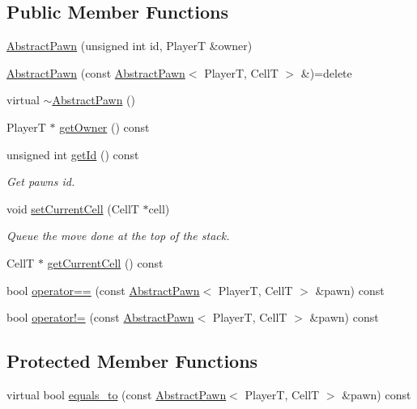 \subsection*{Public Member Functions}
\begin{DoxyCompactItemize}
\item 
\hyperlink{classgame_1_1_abstract_pawn_af1bc0b6647a170f6d4be38a6475757e3}{Abstract\+Pawn} (unsigned int id, PlayerT \&owner)
\item 
\hyperlink{classgame_1_1_abstract_pawn_af83fab32ac2e13daf3c693d465a061ed}{Abstract\+Pawn} (const \hyperlink{classgame_1_1_abstract_pawn}{Abstract\+Pawn}$<$ PlayerT, CellT $>$ \&)=delete
\item 
virtual \hyperlink{classgame_1_1_abstract_pawn_a3fa5336d077fb00b3b3df2bc662e62eb}{$\sim$\+Abstract\+Pawn} ()
\item 
PlayerT $\ast$ \hyperlink{classgame_1_1_abstract_pawn_aac49fdd8bd4aa4386fd47d3f6993b8df}{get\+Owner} () const
\item 
unsigned int \hyperlink{classgame_1_1_abstract_pawn_a49354506912d0e1bf5272627aa2bc86e}{get\+Id} () const
\begin{DoxyCompactList}\small\item\em Get pawn\textquotesingle{}s id. \end{DoxyCompactList}\item 
void \hyperlink{classgame_1_1_abstract_pawn_a678ab4c2f0191bafa3e1e16cf04fa9d0}{set\+Current\+Cell} (CellT $\ast$cell)
\begin{DoxyCompactList}\small\item\em Queue the move done at the top of the stack. \end{DoxyCompactList}\item 
CellT $\ast$ \hyperlink{classgame_1_1_abstract_pawn_ae9ad3bf0ee738571d0dd5992feae6bb7}{get\+Current\+Cell} () const
\item 
bool \hyperlink{classgame_1_1_abstract_pawn_a65dada55fadc0df1169d8a6b0661c05a}{operator==} (const \hyperlink{classgame_1_1_abstract_pawn}{Abstract\+Pawn}$<$ PlayerT, CellT $>$ \&pawn) const
\item 
bool \hyperlink{classgame_1_1_abstract_pawn_a8c5ef6187be3592d15ba9cf6a433c91c}{operator!=} (const \hyperlink{classgame_1_1_abstract_pawn}{Abstract\+Pawn}$<$ PlayerT, CellT $>$ \&pawn) const
\end{DoxyCompactItemize}
\subsection*{Protected Member Functions}
\begin{DoxyCompactItemize}
\item 
virtual bool \hyperlink{classgame_1_1_abstract_pawn_aa1911c1f88d6b345a4a004cded7e6904}{equals\+\_\+to} (const \hyperlink{classgame_1_1_abstract_pawn}{Abstract\+Pawn}$<$ PlayerT, CellT $>$ \&pawn) const
\end{DoxyCompactItemize}


